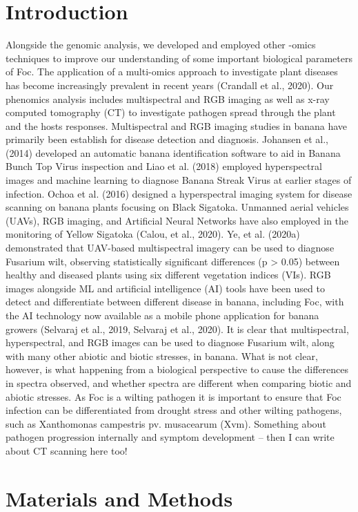 \section{Introduction}
Alongside the genomic analysis, we developed and employed other -omics techniques to improve our understanding of some important biological parameters of Foc. The application of  a multi-omics approach to investigate plant diseases has become increasingly prevalent in recent years (Crandall et al., 2020). Our phenomics analysis includes multispectral and RGB imaging as well as x-ray computed tomography (CT) to investigate pathogen spread through the plant and the hosts responses. 
Multispectral and RGB imaging studies in banana have primarily been establish for disease detection and diagnosis. Johansen et al., (2014) developed an automatic banana identification software to aid in Banana Bunch Top Virus inspection and Liao et al. (2018) employed hyperspectral images and machine learning to diagnose Banana Streak Virus at earlier stages of infection. Ochoa et al. (2016) designed a hyperspectral imaging system for disease scanning on banana plants focusing on Black Sigatoka. Unmanned aerial vehicles (UAVs), RGB imaging, and Artificial Neural Networks have also employed in the monitoring of Yellow Sigatoka (Calou, et al., 2020). Ye, et al. (2020a) demonstrated that UAV-based multispectral imagery can be used to diagnose Fusarium wilt, observing statistically significant differences (p > 0.05) between healthy and diseased plants using six different vegetation indices (VIs). RGB images alongside ML and artificial intelligence (AI) tools have been used to detect and differentiate between different disease in banana, including Foc, with the AI technology now available as a mobile phone application for banana growers (Selvaraj et al., 2019, Selvaraj et al., 2020).
It is clear that multispectral, hyperspectral, and RGB images can be used to diagnose Fusarium wilt, along with many other abiotic and biotic stresses, in banana. What is not clear, however, is what happening from a biological perspective to cause the differences in spectra observed, and whether spectra are different when comparing biotic and abiotic stresses. As Foc is a wilting pathogen it is important to ensure that Foc infection can be differentiated from drought stress and other wilting pathogens, such as Xanthomonas campestris pv. musacearum (Xvm). 
Something about pathogen progression internally and symptom development – then I can write about CT scanning here too! 

\section{Materials and Methods}\label{sec:Chapter4_MM}
